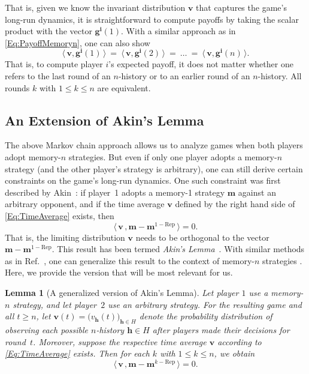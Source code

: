 \documentclass[9pt,twoside,lineno]{pnas-new}
\theoremstyle{plainCl1}
\newtheorem{lemma}{Lemma}
\theoremstyle{plainCl2}
\begin{document}
That is, given we know the invariant distribution $\mathbf{v}$ that captures the game's long-run dynamics, it is straightforward to compute payoffs by taking the scalar product with the vector $\mathbf{g^i}(1)$.
With a similar approach as in \eqref{Eq:PayoffMemoryn}, one can also show
\begin{equation} \label{Eq:EquivalencePayoff}
\big\langle\, \mathbf{v}, \mathbf{g^i}(1)\,\big\rangle  
~=~ \big\langle\, \mathbf{v}, \mathbf{g^i}(2)\,\big\rangle
~=~ \ldots
~=~ \big\langle\, \mathbf{v}, \mathbf{g^i}(n)\,\big\rangle.
\end{equation}
That is, to compute player $i$'s expected payoff, it does not matter whether one refers to the last round of an $n$-history or to an earlier round of an $n$-history. All rounds $k$ with $1\!\le\! k\! \le \! n$ are equivalent.



\subsection{An Extension of Akin's Lemma}
The above Markov chain approach allows us to analyze games when both players adopt memory-$n$ strategies. 
But even if only one player adopts a memory-$n$ strategy (and the other player's strategy is arbitrary), one can still  derive certain constraints on the game's long-run dynamics. 
One such constraint was first described by Akin~\citep{akin:EGADS:2016}: 
if player~1 adopts a memory-1 strategy $\mathbf{m}$ against an arbitrary opponent, and if the time average $\mathbf{v}$ defined by the right hand side of \eqref{Eq:TimeAverage} exists, then
\begin{equation}
\big\langle\, \mathbf{v}\, , \mathbf{m}-\mathbf{m}^{1-\text{Rep}}\,\big\rangle = 0. 
\end{equation}
That is, the limiting distribution $\mathbf{v}$ needs to be orthogonal to the vector $\mathbf{m}-\mathbf{m}^{1-\text{Rep}}$. 
This result has been termed {\it Akin's Lemma}~\citep{hilbe:PNAS:2014b}. 
With similar methods as in Ref.~\citep{akin:EGADS:2016}, one can generalize this result to the context of memory-$n$ strategies \cite{ueda:RSOP:2021}. 
Here, we provide the version that will be most relevant for us.  


\begin{lemma}[A generalized version of Akin's Lemma]\label{lemma:AkinGeneralised}
Let player $1$ use a memory-$n$ strategy, and let player~$2$ use an arbitrary
strategy. For the resulting game and all $t\!\ge\!n$, let $\mathbf{v}(t)\!=\!\big( v_\mathbf{h}(t) \big)_{\mathbf{h}\in H}$ denote the probability distribution of observing each possible $n$-history $\mathbf{h}\!\in\! H$ after players made their decisions for round~$t$. Moreover, suppose the respective time average $\mathbf{v}$ according to \eqref{Eq:TimeAverage} exists. Then for each $k$ with $1\!\le\!k\!\le\!n$, we obtain
\begin{equation} \label{Eq:Akin}
\big\langle\, \mathbf{v}\, , \mathbf{m}-\mathbf{m}^{k-\text{Rep}}\,\big\rangle = 0. 
\end{equation}
\end{lemma}
\end{document}
